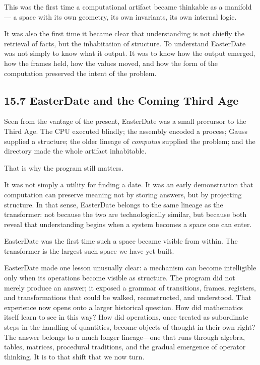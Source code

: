 This was the first time a computational artifact became thinkable as a
manifold --- a space with its own geometry, its own invariants, its own
internal logic.

It was also the first time it became clear that understanding is not
chiefly the retrieval of facts, but the inhabitation of structure. To
understand EasterDate was not simply to know what it output. It was to
know how the output emerged, how the frames held, how the values moved,
and how the form of the computation preserved the intent of the problem.

\hypertarget{easterdate-and-the-coming-third-age}{%
\subsection{15.7 EasterDate and the Coming Third
Age}\label{easterdate-and-the-coming-third-age}}

Seen from the vantage of the present, EasterDate was a small precursor
to the Third Age. The CPU executed blindly; the assembly encoded a
process; Gauss supplied a structure; the older lineage of
\emph{computus} supplied the problem; and the directory made the whole
artifact inhabitable.

That is why the program still matters.

It was not simply a utility for finding a date. It was an early
demonstration that computation can preserve meaning not by storing
answers, but by projecting structure. In that sense, EasterDate belongs
to the same lineage as the transformer: not because the two are
technologically similar, but because both reveal that understanding
begins when a system becomes a space one can enter.

EasterDate was the first time such a space became visible from within.
The transformer is the largest such space we have yet built.

EasterDate made one lesson unusually clear: a mechanism can become
intelligible only when its operations become visible as structure. The
program did not merely produce an answer; it exposed a grammar of
transitions, frames, registers, and transformations that could be
walked, reconstructed, and understood. That experience now opens onto a
larger historical question. How did mathematics itself learn to see in
this way? How did operations, once treated as subordinate steps in the
handling of quantities, become objects of thought in their own right?
The answer belongs to a much longer lineage---one that runs through
algebra, tables, matrices, procedural traditions, and the gradual
emergence of operator thinking. It is to that shift that we now turn.

